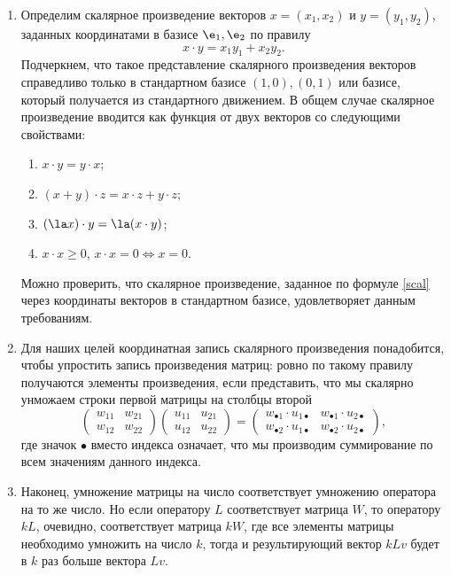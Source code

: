 \begin{enumerate}
\item Определим скалярное произведение векторов $x=(x_1,x_2)$ и $y=(y_1,y_2)$, заданных координатами в базисе $\e_1,\e_2$ по правилу
\begin{equation}\label{scal}
x\cdot y = x_1y_1+x_2y_2.
\end{equation}
Подчеркнем, что такое представление скалярного произведения векторов справедливо только в стандартном базисе $(1,0), (0,1)$ или базисе, который получается из стандартного движением. В общем случае скалярное произведение вводится как функция от двух векторов со следующими свойствами:
\begin{enumerate}[SP1]
\item $x\cdot y=y\cdot x$;
\item $(x+y)\cdot z = x\cdot z + y\cdot z$;
\item $(\la x)\cdot y = \la(x\cdot y)$;
\item $x\cdot x\ge 0$, $x\cdot x=0\Leftrightarrow x=0$.
\end{enumerate}
Можно проверить, что скалярное произведение, заданное по формуле \eqref{scal} через координаты векторов в стандартном базисе, удовлетворяет данным требованиям.
\item Для наших целей координатная запись скалярного произведения понадобится, чтобы упростить запись произведения матриц: ровно по такому правилу получаются элементы произведения, если представить, что мы скалярно унможаем строки первой матрицы на столбцы второй
$$
\begin{pmatrix}
w_{11} & w_{21} \\ w_{12} & w_{22}
\end{pmatrix}
\begin{pmatrix}
u_{11} & u_{21} \\ u_{12} & u_{22}
\end{pmatrix}
=
\begin{pmatrix}
w_{\bullet 1}\cdot u_{1\bullet} & w_{\bullet 1}\cdot u_{2\bullet} \\ 
w_{\bullet 2}\cdot u_{1\bullet} & w_{\bullet 2}\cdot u_{2\bullet}
\end{pmatrix},
$$
где значок $\bullet$ вместо индекса означает, что мы производим суммирование по всем значениям данного индекса.

\item Наконец, умножение матрицы на число соответствует умножению оператора на то же число. Но если оператору $L$ соответствует матрица $W$, то оператору $kL$, очевидно, соответствует матрица $kW$, где все элементы матрицы необходимо умножить на число $k$, тогда и результирующий вектор $kLv$ будет в $k$ раз больше вектора $Lv$.


\end{enumerate}
